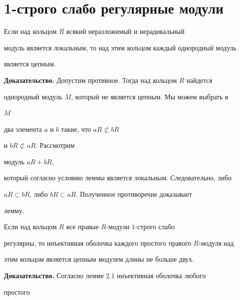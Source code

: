  


 


\section{1-строго слабо регулярные модули} 


 


\begin{lems} 


Если над кольцом $R$ всякий неразложимый и нерадикальный  


модуль является локальным, то над этим кольцом каждый однородный модуль  


является цепным. 


\end{lems} 


 


{\bf Доказательство.} Допустим противное. Тогда над кольцом $R$ найдется  


однородный модуль $M$, который не является цепным. Мы можем выбрать в 


$M$ 


два элемента $a$ и $b$ такие, что $aR\not\subset bR$ 


и $bR\not\subset aR$. Рассмотрим 


модуль $aR+bR$,  


который согласно условию леммы является локальным. Следовательно, либо 


$aR\subset bR$, либо $bR\subset aR$. Полученное противоречие доказывает 


лемму. 


 


\begin{lems} 


Если над кольцом $R$ все правые $R$-модули $1$-строго слабо  


регулярны, то инъективная оболочка каждого простого правого $R$-модуля над  


этим кольцом является цепным модулем длины не больше двух. 


\end{lems} 


 


{\bf Доказательство.} Согласно лемме 2.1 инъективная оболочка любого 


простого  



